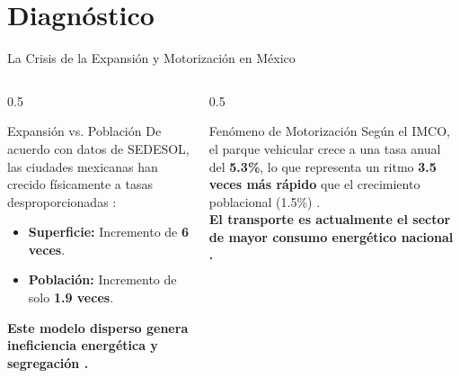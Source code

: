 
\section{Diagnóstico}


\begin{frame}{La Crisis de la Expansión y Motorización en México}
    \begin{columns}[T]
        \begin{column}{0.5\textwidth}
            \begin{block}{Expansión vs. Población}
                De acuerdo con datos de SEDESOL, las ciudades mexicanas han crecido físicamente a tasas desproporcionadas \cite{SEDESOL2012}:
                \begin{itemize}
                    \item \textbf{Superficie:} Incremento de \textbf{6 veces}.
                    \item \textbf{Población:} Incremento de solo \textbf{1.9 veces}.
                \end{itemize}
                \textbf{\small Este modelo disperso genera ineficiencia energética y segregación \cite{ITDP_Espacio}.}
            \end{block}
        \end{column}
        \begin{column}{0.5\textwidth}
            \begin{alertblock}{Fenómeno de Motorización}
                Según el IMCO, el parque vehicular crece a una tasa anual del \textbf{5.3\%}, lo que representa un ritmo \textbf{3.5 veces más rápido} 
                que el crecimiento poblacional (1.5\%) \cite{IMCO2019Doc}. \\
                \textbf{\small El transporte es actualmente el sector de mayor consumo energético nacional \cite{ITDP_Espacio}.}
              \end{alertblock}
        \end{column}
    \end{columns}
\end{frame}

